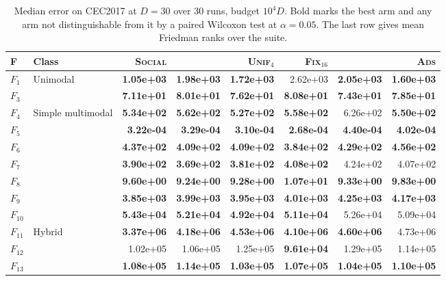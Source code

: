 \begin{table}[t]
\caption{Median error on CEC2017 at $D=30$ over 30 runs, budget $10^{4}D$. Bold marks the best arm and any arm not distinguishable from it by a paired Wilcoxon test at $\alpha=0.05$. The last row gives mean Friedman ranks over the suite.}
\label{tab:cec30}
\centering
\small
\setlength{\tabcolsep}{4pt}
\begin{tabular}{@{}llrrrrrr@{}}
\toprule
F & Class & \textsc{Social} & \permcontrol{} & \textsc{Unif}$_4$ & \textsc{Fix}$_{16}$ & \polcontrol{} & \textsc{Ads} \\
\midrule
$F_{1}$ & Unimodal & \textbf{1.05e+03} & \textbf{1.98e+03} & \textbf{1.72e+03} & 2.62e+03 & \textbf{2.05e+03} & \textbf{1.60e+03} \\
$F_{3}$ &  & \textbf{7.11e+01} & \textbf{8.01e+01} & \textbf{7.62e+01} & \textbf{8.08e+01} & \textbf{7.43e+01} & \textbf{7.85e+01} \\
$F_{4}$ & Simple multimodal & \textbf{5.34e+02} & \textbf{5.62e+02} & \textbf{5.27e+02} & \textbf{5.58e+02} & 6.26e+02 & \textbf{5.50e+02} \\
$F_{5}$ &  & \textbf{3.22e-04} & \textbf{3.29e-04} & \textbf{3.10e-04} & \textbf{2.68e-04} & \textbf{4.40e-04} & \textbf{4.02e-04} \\
$F_{6}$ &  & \textbf{4.37e+02} & \textbf{4.09e+02} & \textbf{4.09e+02} & \textbf{3.84e+02} & \textbf{4.29e+02} & \textbf{4.56e+02} \\
$F_{7}$ &  & \textbf{3.90e+02} & \textbf{3.69e+02} & \textbf{3.81e+02} & \textbf{4.08e+02} & 4.24e+02 & 4.07e+02 \\
$F_{8}$ &  & \textbf{9.60e+00} & \textbf{9.24e+00} & \textbf{9.28e+00} & \textbf{1.07e+01} & \textbf{9.33e+00} & \textbf{9.83e+00} \\
$F_{9}$ &  & \textbf{3.85e+03} & \textbf{3.99e+03} & \textbf{3.95e+03} & \textbf{4.01e+03} & \textbf{4.25e+03} & \textbf{4.17e+03} \\
$F_{10}$ &  & \textbf{5.43e+04} & \textbf{5.21e+04} & \textbf{4.92e+04} & \textbf{5.11e+04} & 5.26e+04 & 5.09e+04 \\
$F_{11}$ & Hybrid & \textbf{3.37e+06} & \textbf{4.18e+06} & \textbf{4.53e+06} & \textbf{4.10e+06} & \textbf{4.60e+06} & 4.73e+06 \\
$F_{12}$ &  & 1.02e+05 & 1.06e+05 & 1.25e+05 & \textbf{9.61e+04} & 1.29e+05 & 1.14e+05 \\
$F_{13}$ &  & \textbf{1.08e+05} & \textbf{1.14e+05} & \textbf{1.03e+05} & \textbf{1.07e+05} & \textbf{1.04e+05} & \textbf{1.10e+05} \\

\end{tabular}
\end{table}
